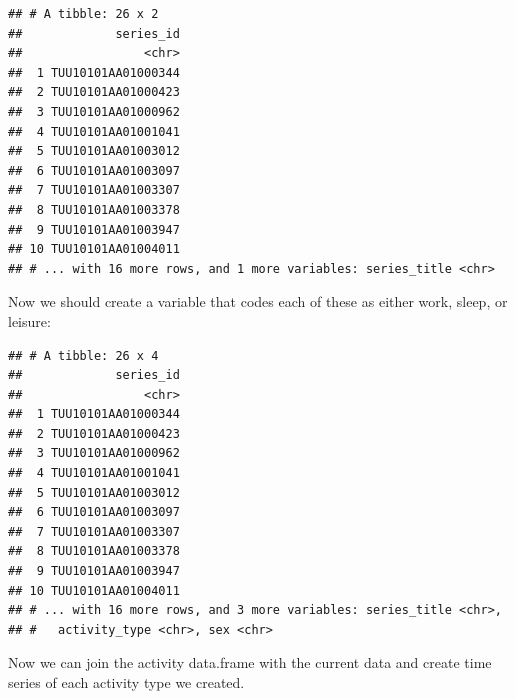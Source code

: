 \documentclass[]{book}
\newenvironment{Shaded}{\begin{snugshade}}{\end{snugshade}}
\newcommand{\KeywordTok}[1]{\textcolor[rgb]{0.13,0.29,0.53}{\textbf{{#1}}}}
\newcommand{\DataTypeTok}[1]{\textcolor[rgb]{0.13,0.29,0.53}{{#1}}}
\newcommand{\StringTok}[1]{\textcolor[rgb]{0.31,0.60,0.02}{{#1}}}
\newcommand{\OtherTok}[1]{\textcolor[rgb]{0.56,0.35,0.01}{{#1}}}
\newcommand{\NormalTok}[1]{{#1}}
\theoremstyle{definition}
\theoremstyle{definition}
\theoremstyle{remark}
\begin{document}
\begin{verbatim}
## # A tibble: 26 x 2
##             series_id
##                 <chr>
##  1 TUU10101AA01000344
##  2 TUU10101AA01000423
##  3 TUU10101AA01000962
##  4 TUU10101AA01001041
##  5 TUU10101AA01003012
##  6 TUU10101AA01003097
##  7 TUU10101AA01003307
##  8 TUU10101AA01003378
##  9 TUU10101AA01003947
## 10 TUU10101AA01004011
## # ... with 16 more rows, and 1 more variables: series_title <chr>
\end{verbatim}

Now we should create a variable that codes each of these as either work,
sleep, or leisure:

\begin{Shaded}
\end{Shaded}

\begin{verbatim}
## # A tibble: 26 x 4
##             series_id
##                 <chr>
##  1 TUU10101AA01000344
##  2 TUU10101AA01000423
##  3 TUU10101AA01000962
##  4 TUU10101AA01001041
##  5 TUU10101AA01003012
##  6 TUU10101AA01003097
##  7 TUU10101AA01003307
##  8 TUU10101AA01003378
##  9 TUU10101AA01003947
## 10 TUU10101AA01004011
## # ... with 16 more rows, and 3 more variables: series_title <chr>,
## #   activity_type <chr>, sex <chr>
\end{verbatim}

Now we can join the activity data.frame with the current data and create
time series of each activity type we created.

\begin{Shaded}
\end{Shaded}
\end{document}
